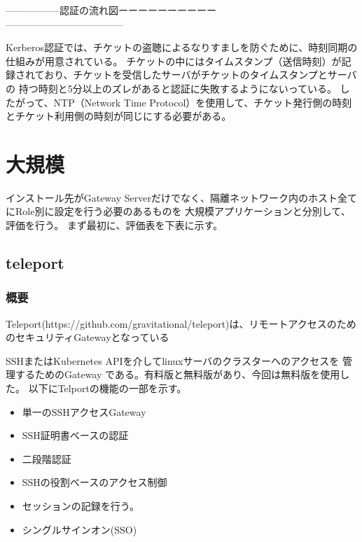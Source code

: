 \documentclass[12pt,a4paper,titlepage]{jsarticle}
\begin{document}
-----------------認証の流れ図ーーーーーーーーーー\\

------------------------------------
\par Kerberos認証では、チケットの盗聴によるなりすましを防ぐために、時刻同期の仕組みが用意されている。
チケットの中にはタイムスタンプ（送信時刻）が記録されており、チケットを受信したサーバがチケットのタイムスタンプとサーバの
持つ時刻と5分以上のズレがあると認証に失敗するようにないっている。
したがって、NTP（Network Time Protocol）を使用して、チケット発行側の時刻とチケット利用側の時刻が同じにする必要がある。



\section{大規模}
インストール先がGateway Serverだけでなく、隔離ネットワーク内のホスト全てにRole別に設定を行う必要のあるものを
大規模アプリケーションと分別して、評価を行う。
まず最初に、評価表を下表に示す。


\subsection{teleport}

\subsubsection*{概要}
Teleport(https://github.com/gravitational/teleport)は、リモートアクセスのためのセキュリティGatewayとなっている


SSHまたはKubernetes APIを介してlinuxサーバのクラスターへのアクセスを
管理するためのGateway である。有料版と無料版があり、今回は無料版を使用した。
以下にTelportの機能の一部を示す。

\begin{itemize}
    \item 単一のSSHアクセスGateway
    \item SSH証明書ベースの認証
    \item 二段階認証
    \item SSHの役割ベースのアクセス制御
    \item セッションの記録を行う。
    \item シングルサインオン(SSO)
\end{itemize}
\end{document}
